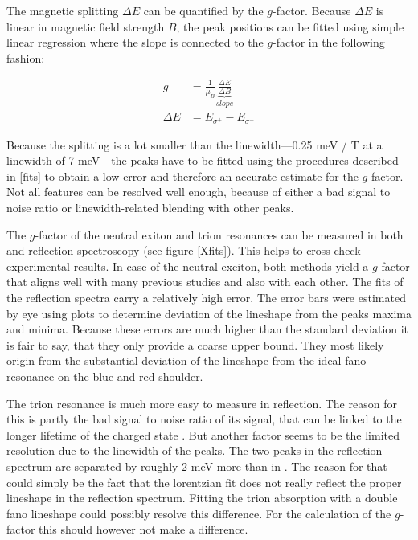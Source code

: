 The magnetic splitting $\Delta E$ can be quantified by the $g$-factor. Because $\Delta E$ is linear in magnetic field strength $B$, the peak positions can be fitted using simple linear regression where the slope is connected to the $g$-factor in the following fashion:

\begin{align}
	g &=  \frac{1}{\mu_B}\underbrace{\frac{\Delta E}{\Delta B}}_{slope} \\
	\Delta E &= E_{\sigma^+} - E_{\sigma^-}
\end{align}

Because the splitting is a lot smaller than the linewidth---0.25 meV / T at a linewidth of 7 meV---the peaks have to be fitted using the procedures described in \ref{fits} to obtain a low error and therefore an accurate estimate for the $g$-factor. Not all features can be resolved well enough, because of either a bad signal to noise ratio or linewidth-related blending with other peaks.

The $g$-factor of the neutral exiton and trion resonances can be measured in both \pl and reflection spectroscopy (see figure \ref{Xfits}). This helps to cross-check experimental results. In case of the neutral exciton, both methods yield a $g$-factor that aligns well with many previous studies  \cite{plechinger_excitonic_2016, stier_exciton_2016, srivastava_valley_2015, mitioglu_magnetoexcitons_2016} and also with each other. The fits of the reflection spectra carry a relatively high error. The error bars were estimated by eye using plots to determine deviation of the lineshape from the peaks maxima and minima. Because these errors are much higher than the standard deviation it is fair to say, that they only provide a coarse upper bound. They most likely origin from the substantial deviation of the lineshape from the ideal fano-resonance on the blue and red shoulder.

The trion resonance is much more easy to measure in reflection. The reason for this is partly the bad signal to noise ratio of its \pl signal, that can be linked to the longer lifetime of the charged state \cite{hao_trion_2017}. But another factor seems to be the limited resolution due to the linewidth of the peaks. The two peaks in the reflection spectrum are separated by roughly 2 meV more than in \pl. The reason for that could simply be the fact that the lorentzian fit does not really reflect the proper lineshape in the reflection spectrum. Fitting the trion absorption with a double fano lineshape could possibly resolve this difference. For the calculation of the $g$-factor this should however not make a difference.

